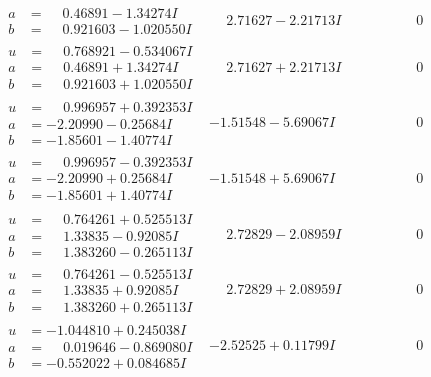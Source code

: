 \documentclass[1p]{elsarticle_modified}
\theoremstyle{definition}
\begin{document}
$$\begin{array}{c|c|c}
\begin{aligned}
a &= \phantom{-}0.46891 - 1.34274 I \\
b &= \phantom{-}0.921603 - 1.020550 I\end{aligned}
 & \phantom{-}2.71627 - 2.21713 I & \phantom{-0.000000 } 0 \\ \hline\begin{aligned}
u &= \phantom{-}0.768921 - 0.534067 I \\
a &= \phantom{-}0.46891 + 1.34274 I \\
b &= \phantom{-}0.921603 + 1.020550 I\end{aligned}
 & \phantom{-}2.71627 + 2.21713 I & \phantom{-0.000000 } 0 \\ \hline\begin{aligned}
u &= \phantom{-}0.996957 + 0.392353 I \\
a &= -2.20990 - 0.25684 I \\
b &= -1.85601 - 1.40774 I\end{aligned}
 & -1.51548 - 5.69067 I & \phantom{-0.000000 } 0 \\ \hline\begin{aligned}
u &= \phantom{-}0.996957 - 0.392353 I \\
a &= -2.20990 + 0.25684 I \\
b &= -1.85601 + 1.40774 I\end{aligned}
 & -1.51548 + 5.69067 I & \phantom{-0.000000 } 0 \\ \hline\begin{aligned}
u &= \phantom{-}0.764261 + 0.525513 I \\
a &= \phantom{-}1.33835 - 0.92085 I \\
b &= \phantom{-}1.383260 - 0.265113 I\end{aligned}
 & \phantom{-}2.72829 - 2.08959 I & \phantom{-0.000000 } 0 \\ \hline\begin{aligned}
u &= \phantom{-}0.764261 - 0.525513 I \\
a &= \phantom{-}1.33835 + 0.92085 I \\
b &= \phantom{-}1.383260 + 0.265113 I\end{aligned}
 & \phantom{-}2.72829 + 2.08959 I & \phantom{-0.000000 } 0 \\ \hline\begin{aligned}
u &= -1.044810 + 0.245038 I \\
a &= \phantom{-}0.019646 - 0.869080 I \\
b &= -0.552022 + 0.084685 I\end{aligned}
 & -2.52525 + 0.11799 I & \phantom{-0.000000 } 0 \\ \hline\begin{aligned}

\end{aligned}
\end{array}$$
\end{document}
